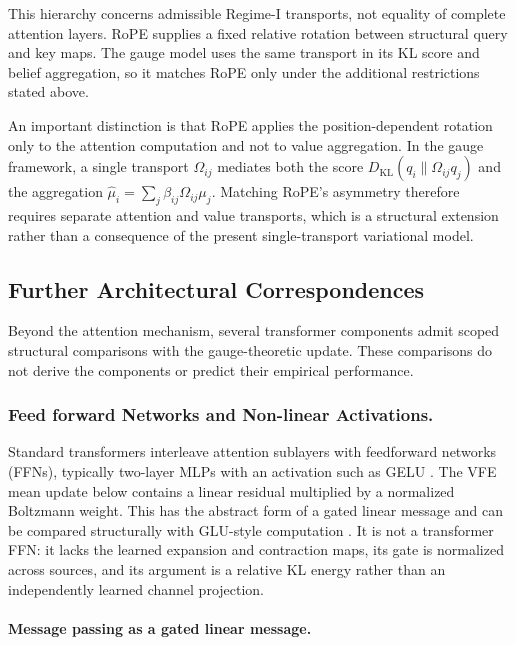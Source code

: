 \documentclass[twoside,11pt]{article}
\begin{document}
This hierarchy concerns admissible Regime-I transports, not equality of complete attention layers. RoPE supplies a fixed relative rotation between structural query and key maps. The gauge model uses the same transport in its KL score and belief aggregation, so it matches RoPE only under the additional restrictions stated above.

An important distinction is that RoPE applies the position-dependent rotation only to the attention computation and not to value aggregation. In the gauge framework, a single transport $\Omega_{ij}$ mediates both the score $D_{\mathrm{KL}}(q_i \| \Omega_{ij} q_j)$ and the aggregation $\hat\mu_i = \sum_j \beta_{ij}\Omega_{ij}\mu_j$. Matching RoPE's asymmetry therefore requires separate attention and value transports, which is a structural extension rather than a consequence of the present single-transport variational model.


\subsection{Further Architectural Correspondences}
\label{sec:further_correspondences}

Beyond the attention mechanism, several transformer components admit scoped structural comparisons with the gauge-theoretic update. These comparisons do not derive the components or predict their empirical performance.

\subsubsection{Feed forward Networks and Non-linear Activations.}
\label{sec:ffn_nonlinearity}

Standard transformers interleave attention sublayers with feedforward networks (FFNs), typically two-layer MLPs with an activation such as GELU \citep{hendrycks2016gaussian}. The VFE mean update below contains a linear residual multiplied by a normalized Boltzmann weight. This has the abstract form of a gated linear message and can be compared structurally with GLU-style computation \citep{dauphin2017language}. It is not a transformer FFN: it lacks the learned expansion and contraction maps, its gate is normalized across sources, and its argument is a relative KL energy rather than an independently learned channel projection.

\paragraph{Message passing as a gated linear message.}
\end{document}
